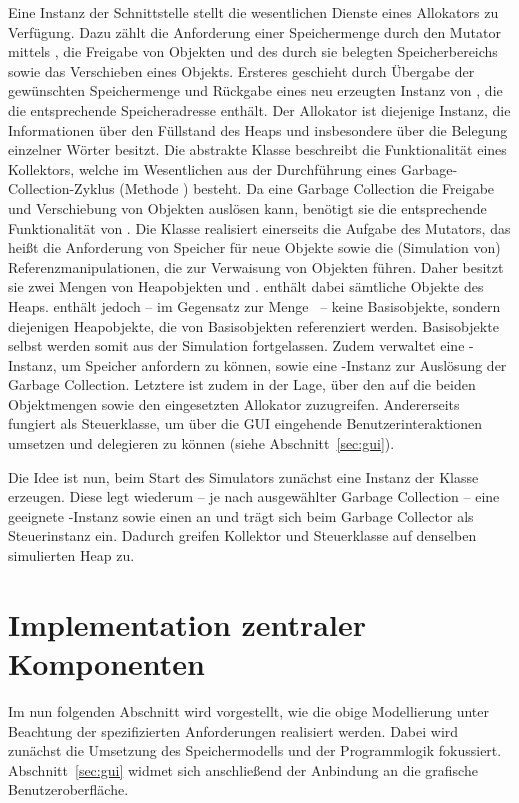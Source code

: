 Eine Instanz der Schnittstelle  stellt die wesentlichen Dienste eines Allokators zu Verfügung.
Dazu zählt die Anforderung einer Speichermenge durch den Mutator mittels , die Freigabe von Objekten und des durch sie belegten Speicherbereichs sowie das Verschieben eines Objekts.
Ersteres geschieht durch Übergabe der gewünschten Speichermenge und Rückgabe eines neu erzeugten Instanz von , die die entsprechende Speicheradresse enthält.
Der Allokator ist diejenige Instanz, die Informationen über den Füllstand des Heaps und insbesondere über die Belegung einzelner Wörter besitzt.
Die abstrakte Klasse  beschreibt die Funktionalität eines Kollektors, welche im Wesentlichen aus der Durchführung eines Garbage-Collection-Zyklus (Methode ) besteht.
Da eine Garbage Collection die Freigabe und Verschiebung von Objekten auslösen kann, benötigt sie die entsprechende Funktionalität von .
Die Klasse  realisiert einerseits die Aufgabe des Mutators, das heißt die Anforderung von Speicher für neue Objekte sowie die (Simulation von) Referenzmanipulationen, die zur Verwaisung von Objekten führen.
Daher besitzt sie zwei Mengen von Heapobjekten  und .
 enthält dabei sämtliche Objekte des Heaps.
 enthält jedoch -- im Gegensatz zur Menge \Roots\ -- keine Basisobjekte, sondern diejenigen Heapobjekte, die von Basisobjekten referenziert werden.
Basisobjekte selbst werden somit aus der Simulation fortgelassen.
Zudem verwaltet  eine -Instanz, um Speicher anfordern zu können, sowie eine -Instanz zur Auslösung der Garbage Collection.
Letztere ist zudem in der Lage, über den  auf die beiden Objektmengen sowie den eingesetzten Allokator zuzugreifen.
Andererseits fungiert  als Steuerklasse, um über die GUI eingehende Benutzerinteraktionen umsetzen und delegieren zu können (siehe Abschnitt~\ref{sec:gui}).

Die Idee ist nun, beim Start des Simulators zunächst eine Instanz der Klasse  erzeugen.
Diese legt wiederum -- je nach ausgewählter Garbage Collection -- eine geeignete -Instanz sowie einen  an und trägt sich beim Garbage Collector als Steuerinstanz ein.
Dadurch greifen Kollektor und Steuerklasse auf denselben simulierten Heap zu.

\section{Implementation zentraler Komponenten}
\label{sec:implementation}
Im nun folgenden Abschnitt wird vorgestellt, wie die obige Modellierung unter Beachtung der spezifizierten Anforderungen realisiert werden.
Dabei wird zunächst die Umsetzung des Speichermodells und der Programmlogik fokussiert.
Abschnitt~\ref{sec:gui} widmet sich anschließend der Anbindung an die grafische Benutzeroberfläche.

